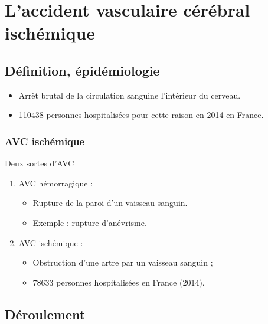 \section{L'accident vasculaire c\'er\'ebral isch\'emique}






\subsection{D\'efinition, \'epid\'emiologie}

\begin{frame}
\begin{itemize}
\item<+-> Arr\^et brutal de la circulation sanguine  l'int\'erieur du cerveau.
\item<+-> 110438 personnes hospitalis\'ees pour cette raison en 2014 en France.
\end{itemize}
\end{frame}





\begin{frame}
\frametitle{AVC isch\'emique}
\begin{block}{Deux sortes d'AVC}
\begin{enumerate}
\item<+-> AVC h\'emorragique :
\begin{itemize}
\item<+-> Rupture de la paroi d'un vaisseau sanguin.
\item<+-> Exemple : rupture d'an\'evrisme.
\end{itemize}
\item<+-> AVC isch\'emique :
\begin{itemize}
\item<+-> Obstruction d'une artre par un vaisseau sanguin ;
\item<+-> 78633 personnes hospitalis\'ees en France (2014).
\end{itemize}
\end{enumerate}
\end{block}
\end{frame}

\subsection{D\'eroulement}

